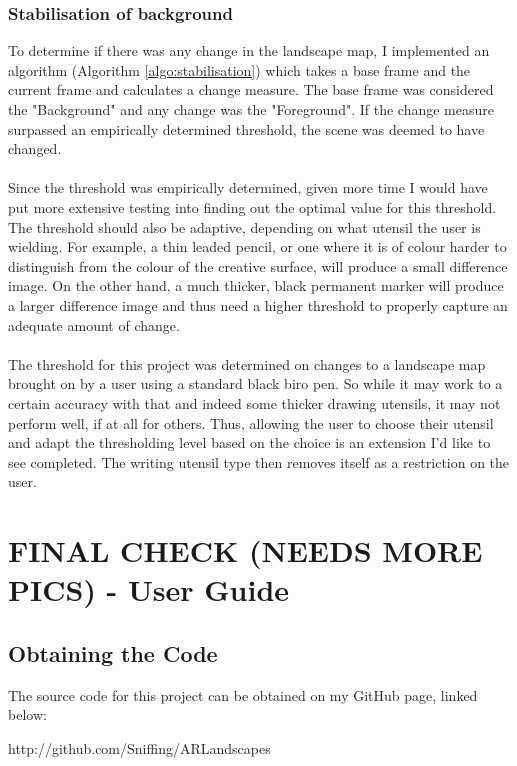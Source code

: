 \documentclass[11pt]{article}
\begin{document}
\subsubsection{Stabilisation of background}
To determine if there was any change in the landscape map, I implemented an
algorithm (Algorithm \ref{algo:stabilisation}) which takes a base frame 
and the current frame and calculates a change measure. The base 
frame was considered the "Background" and any change was the
"Foreground". If the change measure surpassed an empirically determined 
threshold, the scene was deemed to have changed.\\
\\
Since the threshold was empirically determined, given more time I would
have put more extensive testing into finding out the optimal value for 
this threshold. The threshold should also be adaptive, depending on what
utensil the user is wielding. For example, a thin leaded pencil, or one where
it is of colour harder to distinguish from the colour of the creative 
surface, will produce a small difference image. On the other hand, a 
much thicker, black permanent marker will produce a larger difference image and
thus need a higher threshold to properly capture an adequate amount of 
change.\\
\\
The threshold for this project was determined on changes to a landscape
map brought on by a user using a standard black biro pen. So while it
may work to a certain accuracy with that and indeed some thicker 
drawing utensils, it may not perform well, if at all for others. Thus,
allowing the user to choose their utensil and adapt the thresholding 
level based on the choice is an extension I'd like to see completed. The
writing utensil type then removes itself as a restriction on the user.

\newpage
\section{FINAL CHECK (NEEDS MORE PICS) - User Guide}
\label{chapter:userguide}
\newpage
\subsection{Obtaining the Code}
\label{guide:obtainingcode}
The source code for this project can be obtained on my GitHub page, linked 
below:

\begin{center}
http://github.com/Sniffing/ARLandscapes
\end{center}
\end{document}
